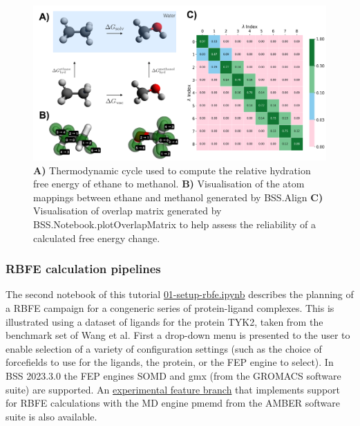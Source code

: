 \begin{figure}[htp]
\includegraphics[width=\linewidth]{LIVECOMS/04_fep/introfep_updated.png}
\caption{ \textbf{A)} Thermodynamic cycle used to compute the relative hydration free energy of ethane to methanol. \textbf{B)} Visualisation of the atom mappings between ethane and methanol generated by BSS.Align \textbf{C)} Visualisation of overlap matrix generated by BSS.Notebook.plotOverlapMatrix to help assess the reliability of a calculated free energy change.}
\label{thermodynamic_cycle_fig}
\end{figure}


\subsubsection{RBFE calculation pipelines}

The second notebook of this tutorial \href{https://github.com/OpenBioSim/BioSimSpaceTutorials/blob/main/04_fep/02_RBFE/01_setup_rbfe.ipynb}{01-setup-rbfe.ipynb} describes the planning of a RBFE campaign for a congeneric series of protein-ligand complexes. This is illustrated using a dataset of ligands for the protein TYK2, taken from the benchmark set of Wang et al.\cite{Wang2015} 
First a drop-down menu is presented to the user to enable selection of a variety of configuration settings (such as the choice of forcefields to use for the ligands, the protein, or the FEP engine to select). In BSS 2023.3.0 the FEP engines SOMD and gmx (from the GROMACS software suite) are supported. An \href{https://github.com/michellab/BioSimSpace/tree/feature-amber-fep}{experimental feature branch} that implements support for RBFE calculations with the MD engine pmemd from the AMBER software suite is also available. 

